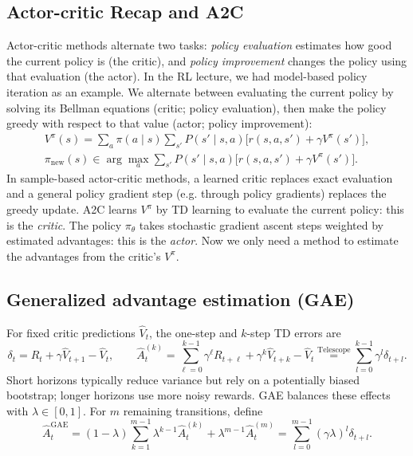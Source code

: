 \documentclass[11pt,a4paper]{article}
\newcommand{\Ahat}{\widehat A}
\newcommand{\Vhat}{\widehat V}
\begin{document}
\subsection{Actor-critic Recap and A2C}
Actor-critic methods alternate two tasks: \emph{policy evaluation} estimates
how good the current policy is (the critic), and \emph{policy improvement}
changes the policy using that evaluation (the actor). In the RL lecture, we had 
model-based policy iteration as an example. We alternate between evaluating the 
current policy by solving its Bellman equations (critic; policy evaluation), then 
make the policy greedy with respect to that value (actor; policy improvement):
\begin{equation}
 \begin{gathered}
 V^\pi(s)=\sum_a\pi(a\mid s)\sum_{s'}P(s'\mid s,a)
 \bigl[r(s,a,s')+\gamma V^\pi(s')\bigr],\\[3pt]
 \pi_{\mathrm{new}}(s)\in\arg\max_a\sum_{s'}P(s'\mid s,a)
 \bigl[r(s,a,s')+\gamma V^\pi(s')\bigr].
 \end{gathered}
\end{equation}
In sample-based actor-critic methods, a learned critic replaces exact evaluation
and a general policy gradient step (e.g. through policy gradients) replaces the greedy update.
A2C learns $V^\pi$ by TD learning to evaluate the current policy: this is the
\emph{critic}. The policy $\pi_\theta$ takes stochastic gradient ascent steps
weighted by estimated advantages: this is the \emph{actor}. Now we only need a method to 
estimate the advantages from the critic's $V^\pi$.

\subsection{Generalized advantage estimation (GAE)}
\begingroup
\setlength{\abovedisplayskip}{5pt}
\setlength{\belowdisplayskip}{5pt}
\setlength{\abovedisplayshortskip}{3pt}
\setlength{\belowdisplayshortskip}{3pt}
For fixed critic predictions $\Vhat_t$, the one-step and $k$-step TD errors are
\begin{equation}\label{eq:td}
 \delta_t=R_t+\gamma\Vhat_{t+1}-\Vhat_t,
 \qquad
 \Ahat_t^{(k)}=\sum_{\ell=0}^{k-1}\gamma^\ell R_{t+\ell}
 +\gamma^k\Vhat_{t+k}-\Vhat_t\overset{\text{Telescope}}{=}\sum_{l=0}^{k-1}\gamma^l\delta_{t+l}.
\end{equation}
Short horizons typically reduce variance but rely on a potentially biased
bootstrap; longer horizons use more noisy rewards. GAE balances these effects
with $\lambda\in[0,1]$. For $m$ remaining transitions, define
\begin{equation}\label{eq:gae}
 \Ahat_t^{\mathrm{GAE}}=(1-\lambda)\sum_{k=1}^{m-1}\lambda^{k-1}\Ahat_t^{(k)}
 +\lambda^{m-1}\Ahat_t^{(m)}
 =\sum_{l=0}^{m-1}(\gamma\lambda)^l\delta_{t+l}.
\end{equation}
\endgroup
\end{document}
